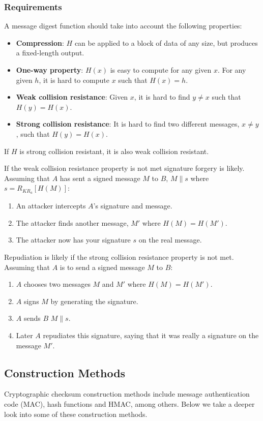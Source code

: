 \documentclass{article}
\begin{document}
\subsubsection{Requirements}
A message digest function should take into account the following properties:
\begin{itemize}
  \item \textbf{Compression}: $H$ can be applied to a block of data of any size, but produces a fixed-length output.
  \item \textbf{One-way property}: $H(x)$ is easy to compute for any given $x$. For any given $h$, it is hard to compute $x$ such that $H(x) = h$.
  \item \textbf{Weak collision resistance}: Given $x$, it is hard to find $y \neq x$ such that $H(y) = H(x)$.
  \item \textbf{Strong collision resistance}: It is hard to find two different messages, $x \neq y$, such that $H(y) = H(x)$.
\end{itemize}
If $H$ is strong collision resistant, it is also weak collision resistant.

If the weak collision resistance property is not met signature forgery is likely. Assuming that $A$ has sent a signed message $M$ to $B$, $M \| s$ where $s=R_{KR_{a}}[H(M)]$:
\begin{enumerate}
  \item An attacker intercepts $A$'s signature and message.
  \item The attacker finds another message, $M'$ where $H(M) = H(M')$.
  \item The attacker now has your signature $s$ on the real message.
\end{enumerate}
Repudiation is likely if the strong collision resistance property is not met. Assuming that $A$ is to send a signed message $M$ to $B$:
\begin{enumerate}
  \item $A$ chooses two messages $M$ and $M'$ where $H(M) = H(M')$.
  \item $A$ signs $M$ by generating the signature.
  \item $A$ sends $B$ $M \| s$.
  \item Later $A$ repudiates this signature, saying that it was really a signature on the message $M'$.
\end{enumerate}

\subsection{Construction Methods}
Cryptographic checksum construction methods include message authentication code (MAC), hash functions and HMAC, among others. Below we take a deeper look into some of these construction methods.
\end{document}
